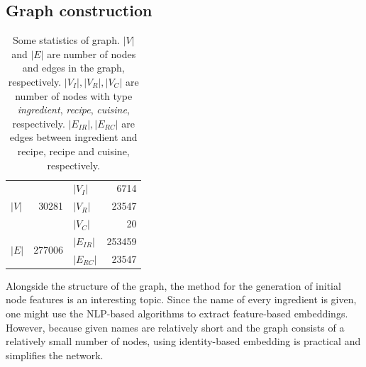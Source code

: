 \subsection{Graph construction}

\begin{table}[btp!]
    \centering
    \begin{tabular}{ l r l r }
        \toprule
        \multirow{3}{*}{$|V|$} & \multirow{3}{*}{30281}  & $|V_{I}|$  & 6714   \\
                               &                         & $|V_{R}|$  & 23547  \\
                               &                         & $|V_{C}|$  & 20     \\
        \midrule
        \multirow{2}{*}{$|E|$} & \multirow{2}{*}{277006} & $|E_{IR}|$ & 253459 \\
                               &                         & $|E_{RC}|$ & 23547  \\
        \bottomrule
    \end{tabular}
    \caption{\label{tab:graph_size}Some statistics of graph. $|V|$ and $|E|$ are number of nodes and edges in the graph, respectively. $|V_{I}|, |V_{R}|, |V_{C}|$ are number of nodes with type \textit{ingredient}, \textit{recipe}, \textit{cuisine}, respectively. $|E_{IR}|, |E_{RC}|$ are edges between ingredient and recipe, recipe and cuisine, respectively.}
\end{table}

Alongside the structure of the graph, the method for the generation of initial node features is an interesting topic.
Since the name of every ingredient is given, one might use the NLP-based algorithms to extract feature-based embeddings.
However, because given names are relatively short and the graph consists of a relatively small number of nodes, using identity-based embedding is practical and simplifies the network.

